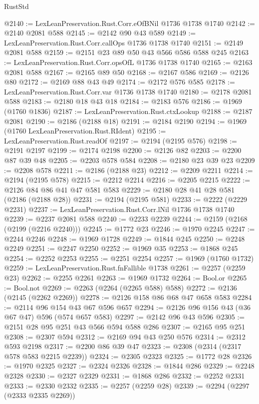 \begin{lexlean}{RustStd}
\begin{coremodule}
@2140 := LexLeanPreservation.Rust.Corr.eOfBNil @1736 @1738 @1740
@2142 := @2140 @2081 @588
@2145 := @2142 @90 @43 @589
@2149 := LexLeanPreservation.Rust.Corr.callOps @1736 @1738 @1740
@2151 := @2149 @2081 @588
@2159 := @2151 @23 @89 @50 @43 @566 @586 @588 @245
@2163 := LexLeanPreservation.Rust.Corr.opsOfL @1736 @1738 @1740
@2165 := @2163 @2081 @588
@2167 := @2165 @89 @50
@2168 := @2167 @586
@2169 := @2126 @80
@2172 := @2169 @88 @43 @49
@2174 := @2172 @576 @585
@2178 := LexLeanPreservation.Rust.Corr.var @1736 @1738 @1740
@2180 := @2178 @2081 @588
@2183 := @2180 @18 @43 @18
@2184 := @2183 @576
@2186 := @1969 (@1760 @1836)
@2187 := LexLeanPreservation.Rust.ctxLookup
@2188 := @2187 @2081
@2190 := @2186 (@2188 @18)
@2191 := @2184 @2190
@2194 := @1969 (@1760 LexLeanPreservation.Rust.RIdent)
@2195 := LexLeanPreservation.Rust.readOf
@2197 := @2194 (@2195 @576)
@2198 := @2191 @2197
@2199 := @2174 @2198
@2200 := @2126 @82
@2203 := @2200 @87 @39 @48
@2205 := @2203 @578 @584
@2208 := @2180 @23 @39 @23
@2209 := @2208 @578
@2211 := @2186 (@2188 @23)
@2212 := @2209 @2211
@2214 := @2194 (@2195 @578)
@2215 := @2212 @2214
@2216 := @2205 @2215
@2222 := @2126 @84 @86 @41 @47 @581 @583
@2229 := @2180 @28 @41 @28 @581 (@2186 (@2188 @28))
@2231 := @2194 (@2195 @581)
@2233 := @2222 (@2229 @2231)
@2237 := LexLeanPreservation.Rust.Corr.lNil @1736 @1738 @1740
@2239 := @2237 @2081 @588
@2240 := @2233 @2239
@2244 := @2159 (@2168 (@2199 (@2216 @2240)))
@2245 := @1772 @23
@2246 := @1970 @2245
@2247 := @2244 @2246
@2248 := @1969 @1728
@2249 := @1844 @245
@2250 := @2248 @2249
@2251 := @2247 @2250
@2252 := @1969 @35
@2253 := @1868 @245
@2254 := @2252 @2253
@2255 := @2251 @2254
@2257 := @1969 (@1760 @1732)
@2259 := LexLeanPreservation.Rust.fnFallible @1738
@2261 := @2257 (@2259 @23)
@2262 := @2255 @2261
@2263 := @1969 @1732
@2264 := Bool.or
@2265 := Bool.not
@2269 := @2263 (@2264 (@2265 @588) @588)
@2272 := @2136 (@2145 (@2262 @2269))
@2278 := @2126 @158 @86 @68 @47 @658 @583
@2284 := @2114 @96 @154 @43 @67 @596 @657
@2294 := @2126 @96 @156 @43 (@36 @67 @47) @596 (@574 @657 @583)
@2297 := @2142 @96 @43 @596
@2305 := @2151 @28 @95 @251 @43 @566 @594 @588 @286
@2307 := @2165 @95 @251
@2308 := @2307 @594
@2312 := @2169 @94 @43 @250 @576
@2314 := @2312 @593 @2198
@2317 := @2200 @86 @39 @47
@2323 := @2308 (@2314 (@2317 @578 @583 @2215 @2239))
@2324 := @2305 @2323
@2325 := @1772 @28
@2326 := @1970 @2325
@2327 := @2324 @2326
@2328 := @1844 @286
@2329 := @2248 @2328
@2330 := @2327 @2329
@2331 := @1868 @286
@2332 := @2252 @2331
@2333 := @2330 @2332
@2335 := @2257 (@2259 @28)
@2339 := @2294 (@2297 (@2333 @2335 @2269))

\end{coremodule}
\end{lexlean}
